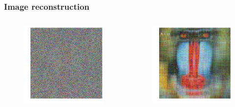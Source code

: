 \documentclass[xcolor={dvipsnames}]{beamer}
\begin{document}
\begin{frame}
\frametitle{Image reconstruction}
\begin{columns}
\hspace{-0.25in}
\begin{figure}
\includegraphics[width=\textwidth]{figs/noise-mandrill.png}
\end{figure}
\begin{figure}
\includegraphics[width=\textwidth]{figs/noise-mandrill-10.png}
\end{figure}
\end{columns}
\end{frame}
\end{document}
